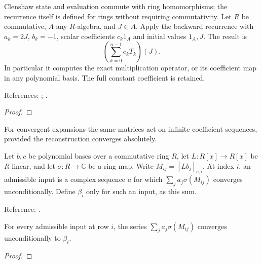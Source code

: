 \begin{theorem}
\label{thm:operator-clenshaw}
\leanok
Clenshaw state and evaluation commute with ring homomorphisms; the recurrence
itself is defined for rings without requiring commutativity.
Let $R$ be commutative, $A$ any $R$-algebra, and $J\in A$. Apply the backward
recurrence with $a_k=2J$, $b_k=-1$, scalar coefficients $c_k1_A$ and initial
values $1_A,J$. The result is
\[
 \left(\sum_{k=0}^{n-1}c_kT_k\right)(J).
\]
In particular it computes the exact multiplication operator, or its coefficient
map in any polynomial basis. The full constant coefficient is retained.


References: \cite{clenshaw}; \cite[Sections 2--3]{olver-townsend}.
\end{theorem}
\begin{proof}
\leanok
\end{proof}


For convergent expansions the same matrices act on infinite coefficient
sequences, provided the reconstruction converges absolutely.

\begin{supporting}
\begin{definition}
\label{def:series-coefficient-map}
\leanok
Let $b,c$ be polynomial bases over a commutative ring $R$, let
$L:R[x]\to R[x]$ be $R$-linear, and let $\sigma:R\to\mathbb C$ be a ring map.
Write $M_{ij}=[Lb_j]_{c,i}$. At index $i$, an admissible input is a complex
sequence $a$ for which $\sum_j a_j\sigma(M_{ij})$ converges unconditionally.
Define $\beta_i$ only for such an input, as this sum.

Reference: \cite[Sections 2--3]{olver-townsend}.
\end{definition}

\begin{theorem}
\label{thm:series-coefficient-map-value}
\leanok
For every admissible input at row $i$, the series $\sum_j a_j\sigma(M_{ij})$
converges unconditionally to $\beta_i$.
\end{theorem}
\begin{proof}
\leanok
\end{proof}
\end{supporting}



